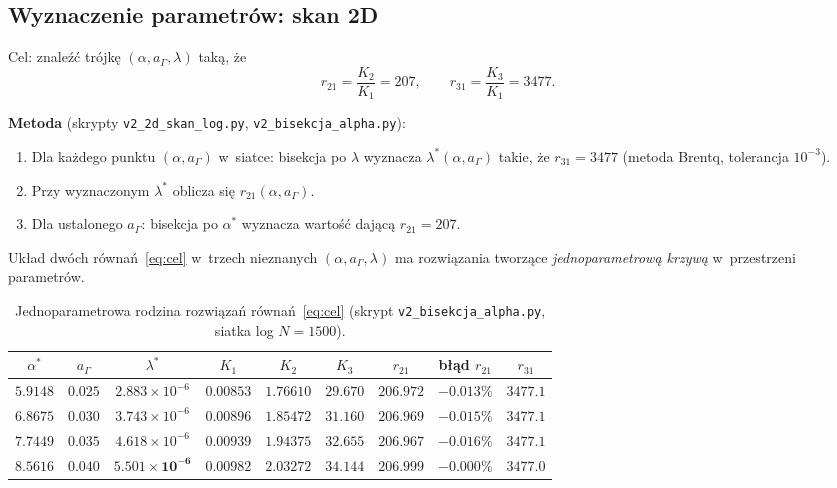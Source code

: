 \subsection{Wyznaczenie parametrów: skan 2D}%
\label{app:I-skan2d}

Cel: znaleźć trójkę $(\alpha, a_\Gamma, \lambda)$ taką, że
\begin{equation}\label{eq:cel}
    r_{21} = \frac{K_2}{K_1} = 207, \qquad r_{31} = \frac{K_3}{K_1} = 3477.
\end{equation}

\textbf{Metoda} (skrypty \texttt{v2\_2d\_skan\_log.py},
\texttt{v2\_bisekcja\_alpha.py}):
\begin{enumerate}[nosep]
    \item Dla każdego punktu $(\alpha, a_\Gamma)$ w~siatce:
          bisekcja po $\lambda$ wyznacza $\lambda^*(\alpha, a_\Gamma)$
          takie, że $r_{31} = 3477$ (metoda Brentq, tolerancja $10^{-3}$).
    \item Przy wyznaczonym $\lambda^*$ oblicza się $r_{21}(\alpha, a_\Gamma)$.
    \item Dla ustalonego $a_\Gamma$: bisekcja po $\alpha^*$ wyznacza
          wartość dającą $r_{21} = 207$.
\end{enumerate}

Układ dwóch równań~\eqref{eq:cel} w~trzech nieznanych
$(\alpha, a_\Gamma, \lambda)$ ma rozwiązania tworzące
\emph{jednoparametrową krzywą} w~przestrzeni parametrów.

\begin{table}[h]
\centering
\small
\caption{Jednoparametrowa rodzina rozwiązań równań~\eqref{eq:cel}
  (skrypt \texttt{v2\_bisekcja\_alpha.py}, siatka log $N=1500$).}
\label{tab:rodzina-rozwiazan}
\begin{tabular}{@{}ccccccccc@{}}
\toprule
$\alpha^*$ & $a_\Gamma$ & $\lambda^*$ & $K_1$ & $K_2$ & $K_3$
    & $r_{21}$ & błąd $r_{21}$ & $r_{31}$ \\
\midrule
$5.9148$ & $0.025$ & $2.883\times10^{-6}$
    & $0.00853$ & $1.76610$ & $29.670$ & $206.972$ & $-0.013\%$ & $3477.1$ \\
$6.8675$ & $0.030$ & $3.743\times10^{-6}$
    & $0.00896$ & $1.85472$ & $31.160$ & $206.969$ & $-0.015\%$ & $3477.1$ \\
$7.7449$ & $0.035$ & $4.618\times10^{-6}$
    & $0.00939$ & $1.94375$ & $32.655$ & $206.967$ & $-0.016\%$ & $3477.1$ \\
$\mathbf{8.5616}$ & $\mathbf{0.040}$ & $\mathbf{5.501\times10^{-6}}$
    & $\mathbf{0.00982}$ & $\mathbf{2.03272}$ & $\mathbf{34.144}$
    & $\mathbf{206.999}$ & $\mathbf{-0.000\%}$ & $\mathbf{3477.0}$ \\
\bottomrule
\end{tabular}
\end{table}

